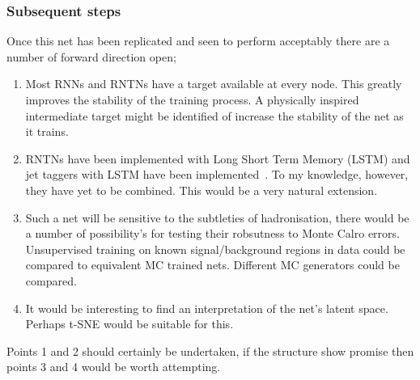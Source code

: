 \subsubsection{Subsequent steps}
Once this net has been replicated and seen to perform acceptably there are a number of forward direction open;
\begin{enumerate}
    \item Most RNNs and RNTNs have a target available at every node.
          This greatly improves the stability of the training process.
          A physically inspired intermediate target might be identified of increase the stability of the net as it trains.
    \item RNTNs have been implemented with Long Short Term Memory (LSTM) and jet taggers with LSTM have been implemented~\cite{Egan:2017ojy}.
      To my knowledge, however, they have yet to be combined.
      This would be a very natural extension.
    \item Such a net will be sensitive to the subtleties of hadronisation, 
        there would be a number of possibility's for testing their robsutness to Monte Calro errors.
        Unsupervised training on known signal/background regions in data could be compared to equivalent MC trained nets.
        Different MC generators could be compared.
    \item It would be interesting to find an interpretation of the net's latent space.
          Perhaps t-SNE would be suitable for this.
\end{enumerate}

Points 1 and 2 should certainly be undertaken, if the structure show promise then points 3 and 4 would be worth attempting.

